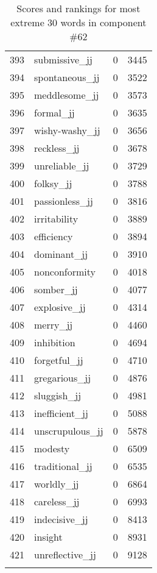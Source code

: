 \begin{longtable}[!htbp]{| rlr@{.}l |}
    393 & submissive\_jj & 0 & 3445 \\
    394 & spontaneous\_jj & 0 & 3522 \\
    395 & meddlesome\_jj & 0 & 3573 \\
    396 & formal\_jj & 0 & 3635 \\
    397 & wishy-washy\_jj & 0 & 3656 \\
    398 & reckless\_jj & 0 & 3678 \\
    399 & unreliable\_jj & 0 & 3729 \\
    400 & folksy\_jj & 0 & 3788 \\
    401 & passionless\_jj & 0 & 3816 \\
    402 & irritability & 0 & 3889 \\
    403 & efficiency & 0 & 3894 \\
    404 & dominant\_jj & 0 & 3910 \\
    405 & nonconformity & 0 & 4018 \\
    406 & somber\_jj & 0 & 4077 \\
    407 & explosive\_jj & 0 & 4314 \\
    408 & merry\_jj & 0 & 4460 \\
    409 & inhibition & 0 & 4694 \\
    410 & forgetful\_jj & 0 & 4710 \\
    411 & gregarious\_jj & 0 & 4876 \\
    412 & sluggish\_jj & 0 & 4981 \\
    413 & inefficient\_jj & 0 & 5088 \\
    414 & unscrupulous\_jj & 0 & 5878 \\
    415 & modesty & 0 & 6509 \\
    416 & traditional\_jj & 0 & 6535 \\
    417 & worldly\_jj & 0 & 6864 \\
    418 & careless\_jj & 0 & 6993 \\
    419 & indecisive\_jj & 0 & 8413 \\
    420 & insight & 0 & 8931 \\
    421 & unreflective\_jj & 0 & 9128 \\
    \hline
    \caption{Scores and rankings for most extreme 30 words in component \#62} \\
\end{longtable}
